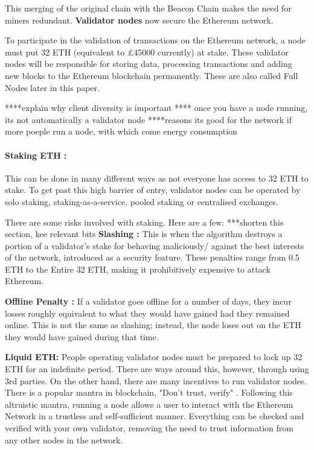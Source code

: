 This merging of the original chain with the Beacon Chain makes the need for miners redundant. \textbf{Validator nodes} now secure the Ethereum network. 

To participate in the validation of transactions on the Ethereum network, a node must put 32 ETH (equivalent to £45000 currently) at stake. These validator nodes will be responsible for storing data, processing transactions and adding new blocks to the Ethereum blockchain permanently. These are also called Full Nodes later in this paper.


 ****explain why client diversity is important
 **** once you have a node running, its not automatically a validator node
****reasons its good for the network if more poeple run a node, with which come energy consumption
 
\paragraph{Staking ETH :}
This can be done in many different ways as not everyone has access to 32 ETH to stake. To get past this high barrier of entry, validator nodes can be operated by solo staking, staking-as-a-service, pooled staking or centralised exchanges.

There are some risks involved with staking. Here are a few:
 ***shorten this section, kee relevant bits
\textbf{Slashing :}
This is when the algorithm destroys a portion of a validator's stake for behaving maliciously/ against the best interests of the network, introduced as a security feature. These penalties range from 0.5 ETH to the Entire 32 ETH, making it prohibitively expensive to attack Ethereum. 

\textbf{Offline Penalty :}
If a validator goes offline for a number of days, they incur losses roughly equivalent to what they would have gained had they remained online. This is not the same as slashing; instead, the node loses out on the ETH they would have gained during that time.

\textbf{Liquid ETH: }
People operating validator nodes must be prepared to lock up 32 ETH for an indefinite period. There are ways around this, however, through using 3rd parties. 
\newline \newline
On the other hand, there are many incentives to run validator nodes. There is a popular mantra in blockchain, "Don't trust, verify" \cite{EthereumEthereum.org}. Following this altruistic mantra, running a node allows a user to interact with the Ethereum Network in a trustless and self-sufficient manner. Everything can be checked and verified with your own validator, removing the need to trust information from any other nodes in the network. 

